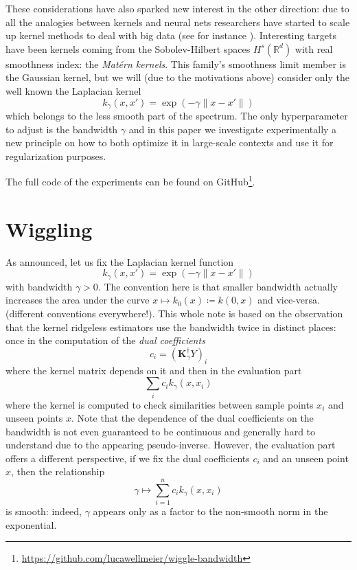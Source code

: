 \documentclass[12pt]{amsart}
\newcommand{\R}{\mathbb{R}}
\begin{document}
These considerations have also sparked new interest in the other direction:
due to all the analogies between kernels and neural nets researchers have
started to scale up kernel methods to deal with big data 
(see for instance \cite{falkon}).
Interesting targets have been kernels coming from the Sobolev-Hilbert spaces
$H^s(\R^d)$ with real smoothness index: the \emph{Matérn kernels}.
This family's smoothness limit member is the Gaussian kernel, but we will 
(due to the motivations above) 
consider only the well known the Laplacian kernel
\[ k_\gamma(x,x') = \exp(-\gamma \| x - x' \|) \]
which belongs to the less smooth part of the spectrum.
The only hyperparameter to adjust is the bandwidth $\gamma$ and in this 
paper we investigate experimentally a new principle on how to both optimize 
it in large-scale contexts and use it for regularization purposes.

The full code of the experiments can be found 
on GitHub\footnote{\url{https://github.com/lucawellmeier/wiggle-bandwidth}}.

\section{Wiggling}

As announced, let us fix the Laplacian kernel function
\[ k_\gamma(x,x') = \exp\left(-\gamma \| x - x' \| \right) \]
with bandwidth $\gamma > 0$.
The convention here is that smaller bandwidth actually increases the 
area under the curve $x \mapsto k_0(x) \coloneqq k(0,x)$ and vice-versa.
(different conventions everywhere!).
This whole note is based on the observation that the kernel ridgeless 
estimators use the bandwidth twice in distinct places:
once in the computation of the \emph{dual coefficients}
\[ c_i = (\mathbf K_\gamma^\dagger Y)_i \]
where the kernel matrix depends on it and then
in the evaluation part
\[ \sum_i c_i k_\gamma(x,x_i) \]
where the kernel is computed to check similarities between sample 
points $x_i$ and unseen points $x$.
Note that the dependence of the dual coefficients on the bandwidth is 
not even guaranteed to be continuous and generally hard to understand
due to the appearing pseudo-inverse.
However, the evaluation part offers a different perspective, if we 
fix the dual coefficients $c_i$ and an unseen point $x$, then
the relationship
\[ \gamma \mapsto \sum_{i=1}^n c_i k_\gamma(x,x_i) \]
is smooth: indeed, $\gamma$ appears only as a factor to the non-smooth
norm in the exponential.
\end{document}
